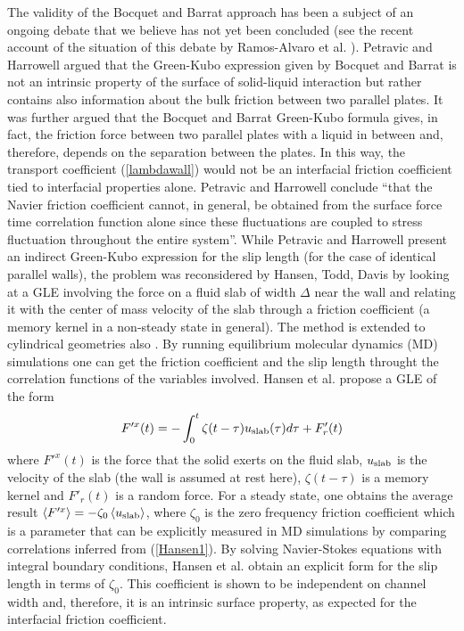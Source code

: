 \documentclass[b5paper,openright,10pt]{book}
\newcommand{\llangle}{\left\langle}
\newcommand{\rrangle}{\right\rangle}
\begin{document}
The  validity of  the Bocquet and Barrat approach has  been a  subject of  an ongoing
debate  \cite{Petravic2007,Hansen2011,Huang2014} that  we believe  has
not yet  been concluded (see  the recent  account of the  situation of
this  debate  by   Ramos-Alvaro  et  al.   \cite{Ramos-Alvarado2016}).
Petravic and Harrowell \cite{Petravic2007}  argued that the Green-Kubo
expression given by Bocquet and Barrat is not  an intrinsic property of the surface of
solid-liquid interaction  but rather  contains also  information about
the bulk friction between two  parallel plates.  It was further argued
that  the Bocquet and Barrat Green-Kubo formula  gives, in  fact, the  friction force
between two parallel  plates with a liquid in  between and, therefore,
depends  on the  separation  between  the plates.   In  this way,  the
transport coefficient  (\ref{lambdawall}) would not be  an interfacial
friction coefficient  tied to interfacial properties  alone.  Petravic
and Harrowell conclude ``that  the Navier friction coefficient cannot,
in  general,  be obtained  from  the  surface force  time  correlation
function  alone  since  these   fluctuations  are  coupled  to  stress
fluctuation  throughout  the  entire  system''.   While  Petravic  and
Harrowell present an  indirect Green-Kubo expression for the  slip length (for
the case of identical parallel walls), the problem was reconsidered by
Hansen, Todd,  Davis \cite{Hansen2011} by  looking at a  GLE involving
the force on a fluid slab of  width $\Delta$ near the wall and relating
it with  the center of  mass velocity of  the slab through  a friction
coefficient (a memory  kernel in a non-steady state  in general).  The
method is  extended to cylindrical geometries  also \cite{Kannam2012}.
By running equilibrium molecular dynamics (MD) simulations one can get
the friction coefficient and the  slip length throught the correlation
functions of the  variables involved.  Hansen et al. propose  a GLE of
the form
\begin{align}
  F'^x(t)=-\int_0^t \zeta(t-\tau)u_{\rm slab}(\tau)d\tau+F'_r(t)
\label{Hansen1}\end{align}
where $ F'^x(t)$ is the force that the solid exerts on the fluid slab,
$u_{\rm slab}$  is the velocity  of the slab  (the wall is  assumed at
rest  here), $\zeta(t-\tau)$  is a  memory kernel  and $F'_r(t)$  is a
random  force.   For a steady  state,  one  obtains the  average  result
$\llangle F'^x\rrangle=-\zeta_0 \llangle  u_{\rm slab}\rrangle$, where
$\zeta_0$  is  the zero  frequency  friction  coefficient which  is  a
parameter  that  can  be  explicitly measured  in  MD  simulations  by
comparing  correlations  inferred  from  (\ref{Hansen1}).  By  solving
Navier-Stokes equations  with integral boundary conditions,  Hansen et
al.   obtain  an  explicit  form  for the  slip  length  in  terms  of
$\zeta_0$. This coefficient is shown to be independent on channel width
and, therefore, it is an intrinsic surface property, as expected for
the interfacial friction coefficient.
\end{document}
